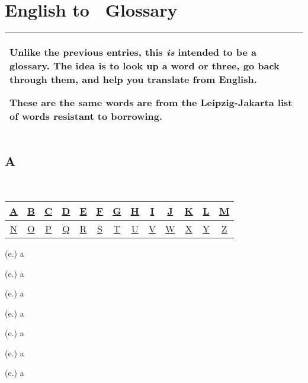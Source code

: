 
\chapter{English to \LanguageName\ Glossary}

\renewcommand{\entryHeading}[1]{
\begin{center}
\setcounter{secnumdepth}{0}
\Huge
\hypertarget{ENU#1}{\section{#1}}

\Large
{\ }

\normalsize
\begin{tabular}{*{13}{|c}|}\hline
\rule{0pt}{15pt}
\hyperlink{ENUA}{\Large A}&
\hyperlink{ENUB}{\Large B}&
\hyperlink{ENUC}{\Large C}&
\hyperlink{ENUD}{\Large D}&
\hyperlink{ENUE}{\Large E}&
\hyperlink{ENUF}{\Large F}&
\hyperlink{ENUG}{\Large G}&
\hyperlink{ENUH}{\Large H}&
\hyperlink{ENUI}{\Large I}&
\hyperlink{ENUJ}{\Large J}&
\hyperlink{ENUK}{\Large K}&
\hyperlink{ENUL}{\Large L}&
\hyperlink{ENUM}{\Large M}\\
\hline
\rule{0pt}{15pt}
\hyperlink{ENUN}{\Large N}&
\hyperlink{ENUO}{\Large O}&
\hyperlink{ENUP}{\Large P}&
\hyperlink{ENUQ}{\Large Q}&
\hyperlink{ENUR}{\Large R}&
\hyperlink{ENUS}{\Large S}&
\hyperlink{ENUT}{\Large T}&
\hyperlink{ENUU}{\Large U}&
\hyperlink{ENUV}{\Large V}&
\hyperlink{ENUW}{\Large W}&
\hyperlink{ENUX}{\Large X}&
\hyperlink{ENUY}{\Large Y}&
\hyperlink{ENUZ}{\Large Z}\\
\hline
\end{tabular}
\end{center}
}

\begin{center}
\begin{tabular}{|p{}|}\hline
Unlike the previous entries, this \emph{is} intended to be a glossary.
The idea is to look up a word or three, go back through them, and help you translate from English.

These are the same words are from the Leipzig-Jakarta list of words resistant to borrowing.
\\\hline
\end{tabular}
\end{center}

\entryHeading{A}
\begin{glosses}
\par {} (e.) {a}
\par {} (e.) {a}
\par {} (e.) {a}
\par {} (e.) {a}
\par {} (e.) {a}
\par {} (e.) {a}
\par {} (e.) {a}
\end{glosses}


